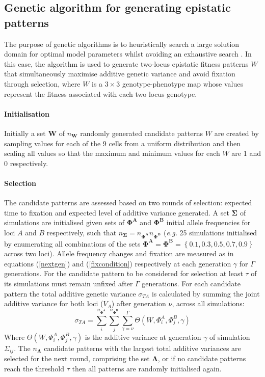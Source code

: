 \subsection{Genetic algorithm for generating epistatic patterns}

The purpose of genetic algorithms is to heuristically search a large solution domain for optimal model parameters whilst avoiding an exhaustive search \citep{Holland1975}. In this case, the algorithm is used to generate two-locus epistatic fitness patterns $W$ that simultaneously maximise additive genetic variance and avoid fixation through selection, where $W$ is a $3 \times 3$ genotype-phenotype map whose values represent the fitness associated with each two locus genotype.

\paragraph{Initialisation}

Initially a set $\mathbf{W}$ of $n_{\mathbf{W}}$ randomly generated candidate patterns $W$ are created by sampling values for each of the 9 cells from a uniform distribution and then scaling all values so that the maximum and minimum values for each $W$ are 1 and 0 respectively. 

\paragraph{Selection}

The candidate patterns are assessed based on two rounds of selection: expected time to fixation and expected level of additive variance generated. A set $\mathbf{\Sigma}$ of simulations are initialised given sets of $\mathbf{\Phi^A}$ and $\mathbf{\Phi^B}$ initial allele frequencies for loci $A$ and $B$ respectively, such that $n_{\mathbf{\Sigma}} = n_{\mathbf{\Phi^A}}n_{\mathbf{\Phi^B}}$ (\emph{e.g.} 25 simulations initialised by enumerating all combinations of the sets $\mathbf{\Phi^A} = \mathbf{\Phi^B} = \left\{0.1, 0.3, 0.5, 0.7, 0.9\right\}$ across two loci). Allele frequency changes and fixation are measured as in equations (\ref{nextgen}) and (\ref{fixcondition}) respectively at each generation $\gamma$ for $\Gamma$ generations. For the candidate pattern to be considered for selection at least $\tau$ of its simulations must remain unfixed after $\Gamma$ generations. For each candidate pattern the total additive genetic variance $\sigma_{TA}$ is calculated by summing the joint additive variance for both loci ($V_A$) after generation $\nu$, across all simulations:
\begin{equation}
\sigma_{TA} = \sum^{n_\mathbf{\Phi^A}}_i\sum^{n_\mathbf{\Phi^B}}_j \sum^{\Gamma}_{\gamma=\nu}\Theta (W,\Phi^A_{i},\Phi^B_{j},\gamma)
\end{equation}
Where $\Theta (W,\Phi^A_{i},\Phi^B_{j},\gamma)$ is the additive variance at generation $\gamma$ of simulation $\Sigma_{ij}$. The $n_{\mathbf{\Lambda}}$ candidate patterns with the largest total additive variances are selected for the next round, comprising the set $\mathbf{\Lambda}$, or if no candidate patterns reach the threshold $\tau$ then all patterns are randomly initialised again.

